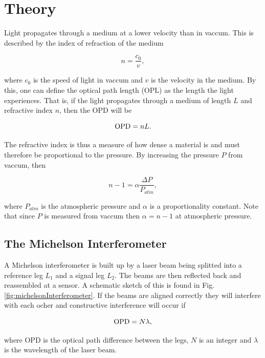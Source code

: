 \section{Theory}

Light propagates through a medium at a lower velocity than in vaccum. This is described by the index of refraction of the medium

\begin{equation}
  \label{eq:refrInd}
  n = \frac{c_0}{v},
\end{equation}

where $c_0$ is the speed of light in vaccum and $v$ is the velocity in the medium\cite{phH}. By this, one can define the optical path length (OPL) as the length the light experiences. That is, if the light propagates through a medium of length $L$ and refractive index $n$, then the OPD will be

\begin{equation}
  \textnormal{OPD} = nL.
\end{equation}

The refractive index is thus a measure of how dense a material is and must therefore be proportional to the pressure. By increasing the pressure $P$ from vaccum, then

\begin{equation}
  \label{eq:refrVaccum}
  n-1 = \alpha \frac{\Delta P}{P_{atm}},
\end{equation}

where $P_{atm}$ is the atmospheric pressure and $\alpha$ is a proportionality constant\cite{nP}. Note that since $P$ is measured from vaccum then $\alpha=n-1$ at atmospheric pressure.

\subsection{The Michelson Interferometer}
A Michelson interferometer is built up by a laser beam being splitted into a reference leg $L_1$ and a signal leg $L_2$. The beams are then reflected back and reassembled at a sensor. A schematic sketch of this is found in Fig. \ref{fig:michelsonInterferometer}. If the beams are aligned correctly they will interfere with each ocher and constructive interference will occur if

\begin{equation}
\label{eq:interference}
  \textnormal{OPD} = N \lambda,
\end{equation}

where OPD is the optical path difference between the legs, $N$ is an integer and $\lambda$ is the wavelength of the laser beam.

